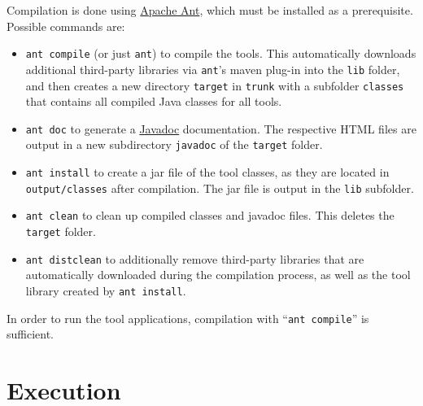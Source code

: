 \documentclass{report}
\begin{document}
Compilation is done using \href{http://ant.apache.org/}{Apache Ant}, which must be installed as a prerequisite. Possible commands are:
%
\begin{itemize}
  \item \verb"ant compile" (or just \verb"ant") to compile the {\hiJAC} tools. This automatically downloads additional third-party libraries via \verb"ant"'s maven plug-in into the \verb"lib" folder, and then creates a new directory \verb"target" in \verb"trunk" with a subfolder \verb"classes" that contains all compiled Java classes for all tools.

  \item \verb"ant doc" to generate a \href{http://www.oracle.com/technetwork/articles/java/index-jsp-135444.html}{Javadoc} documentation. The respective HTML files are output in a new subdirectory \verb"javadoc" of the \verb"target" folder.

  \item \verb"ant install" to create a jar file of the {\hiJAC} tool classes, as they are located in \verb"output/classes" after compilation. The jar file is output in the \verb"lib" subfolder.

  \item \verb"ant clean" to clean up compiled classes and javadoc files. This deletes the \verb"target" folder.

  \item \verb"ant distclean" to additionally remove third-party libraries that are automatically downloaded during the compilation process, as well as the {\hiJAC} tool library created by \verb"ant install".

\end{itemize}
%
In order to run the tool applications, compilation with ``\verb"ant compile"'' is sufficient.

\section{Execution}
\end{document}
